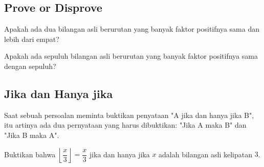 \documentclass[11pt]{scrartcl}
\begin{document}
\subsection{Prove or Disprove}
\begin{example}
    Apakah ada dua bilangan asli berurutan yang banyak faktor positifnya sama dan lebih dari empat?
\end{example}

\begin{example}
    Apakah ada sepuluh bilangan asli berurutan yang banyak faktor positifnya sama dengan sepuluh?
\end{example}

\subsection{Jika dan Hanya jika}
Saat sebuah persoalan meminta buktikan penyataan "A jika dan hanya jika B", itu artinya ada dua pernyataan yang harus dibuktikan: "Jika A maka B" dan "Jika B maka A". 
\begin{example}
    Buktikan bahwa $\left\lfloor \dfrac{x}{3} \right\rfloor = \dfrac{x}{3}$ jika dan hanya jika $x$ adalah bilangan asli kelipatan $3$.
\end{example}
\end{document}
